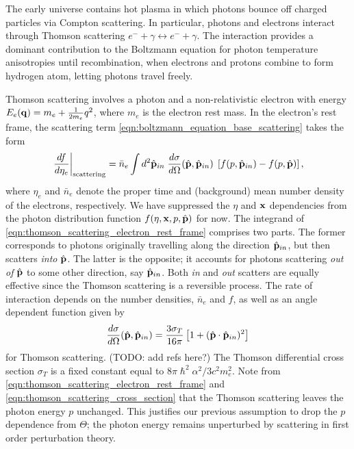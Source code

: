 The early universe contains hot plasma in which photons bounce off charged particles via Compton scattering. In particular, photons and electrons interact through Thomson scattering $e^- + \gamma \leftrightarrow e^- + \gamma$. The interaction provides a dominant contribution to the Boltzmann equation for photon temperature anisotropies until recombination, when electrons and protons combine to form hydrogen atom, letting photons travel freely.

Thomson scattering involves a photon and a non-relativistic electron with energy $E_e (\mathbf{q}) = m_e + \frac{1}{2m_e} q^2$, where $m_e$ is the electron rest mass. In the electron's rest frame, the scattering term \eqref{eqn:boltzmann_equation_base_scattering} takes the form
\begin{align}
	\left. \frac{df}{d\eta_e} \right|_\text{scattering} = \bar{n}_e \int d^2 \hat{\mathbf{p}}_{in} \; \frac{d\sigma}{d\Omega} (\hat{\mathbf{p}}, \hat{\mathbf{p}}_{in}) \; \left[ f(p,\hat{\mathbf{p}}_{in}) - f(p,\hat{\mathbf{p}})\right], \label{eqn:thomson_scattering_electron_rest_frame}
\end{align}
where $\eta_e$ and $\bar{n}_e$ denote the proper time and (background) mean number density of the electrons, respectively. We have suppressed the $\eta$ and $\mathbf{x}$ dependencies from the photon distribution function $f(\eta,\mathbf{x},p,\hat{\mathbf{p}})$ for now. The integrand of \eqref{eqn:thomson_scattering_electron_rest_frame} comprises two parts. The former corresponds to photons originally travelling along the direction $\hat{\mathbf{p}}_{in}$, but then scatters \textit{into} $\hat{\mathbf{p}}$. The latter is the opposite; it accounts for photons scattering \textit{out of} $\hat{\mathbf{p}}$ to some other direction, say $\hat{\mathbf{p}}_{in}$. Both \textit{in} and \textit{out} scatters are equally effective since the Thomson scattering is a reversible process. The rate of interaction depends on the number densities, $\bar{n}_e$ and $f$, as well as an angle dependent function given by
\begin{align}
	\frac{d\sigma}{d\Omega} (\hat{\mathbf{p}}, \hat{\mathbf{p}}_{in}) = \frac{3\sigma_T}{16\pi} \left[ 1 + (\hat{\mathbf{p}} \cdot \hat{\mathbf{p}}_{in})^2 \right] \label{eqn:thomson_scattering_cross_section}
\end{align}
for Thomson scattering. (TODO: add refs here?) The Thomson differential cross section $\sigma_T$ is a fixed constant equal to $8\pi\hslash^2 \alpha^2 / 3c^2 m_e^2$. Note from \eqref{eqn:thomson_scattering_electron_rest_frame} and \eqref{eqn:thomson_scattering_cross_section} that the Thomson scattering leaves the photon energy $p$ unchanged. This justifies our previous assumption to drop the $p$ dependence from $\Theta$; the photon energy remains unperturbed by scattering in first order perturbation theory.

